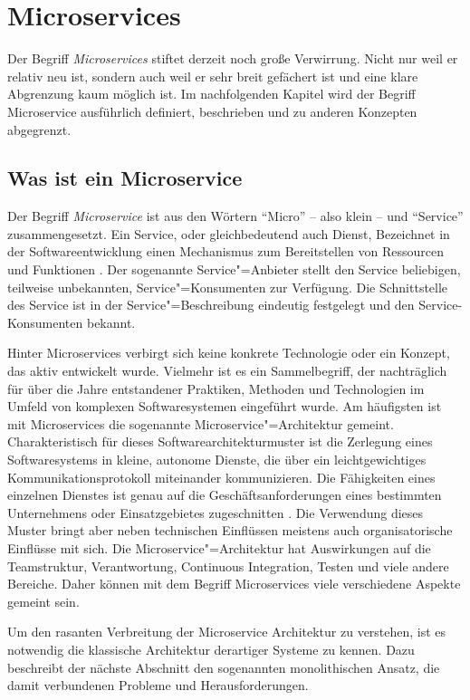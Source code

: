 \chapter{Microservices}

Der Begriff \textit{Microservices} stiftet derzeit noch große Verwirrung. Nicht nur weil er relativ neu ist, sondern auch weil er sehr breit gefächert ist und eine klare Abgrenzung kaum möglich ist. Im nachfolgenden Kapitel wird der Begriff Microservice ausführlich definiert, beschrieben und zu anderen Konzepten abgegrenzt.

\section{Was ist ein Microservice}

Der Begriff \textit{Microservice} ist aus den Wörtern "`Micro"' -- also klein -- und "`Service"' zusammengesetzt. Ein Service, oder gleichbedeutend auch Dienst,  Bezeichnet in der Softwareentwicklung einen Mechanismus zum Bereitstellen von Ressourcen und Funktionen \cite[12]{Brown06referencemodel}. Der sogenannte Service"=Anbieter stellt den Service beliebigen, teilweise unbekannten, Service"=Konsumenten zur Verfügung. Die Schnittstelle des Service ist in der Service"=Beschreibung eindeutig festgelegt und den Service-Konsumenten bekannt.

Hinter Microservices verbirgt sich keine konkrete Technologie oder ein Konzept, das aktiv entwickelt wurde. Vielmehr ist es ein Sammelbegriff, der nachträglich für über die Jahre entstandener Praktiken, Methoden und Technologien im Umfeld von komplexen Softwaresystemen eingeführt wurde. Am häufigsten ist mit Microservices die sogenannte Microservice"=Architektur gemeint. Charakteristisch für dieses Softwarearchitekturmuster ist die Zerlegung eines Softwaresystems in kleine, autonome Dienste, die über ein leichtgewichtiges Kommunikationsprotokoll miteinander kommunizieren. Die Fähigkeiten eines einzelnen Dienstes ist genau auf die Geschäftsanforderungen eines bestimmten Unternehmens oder Einsatzgebietes zugeschnitten \cite{FowlerMS}. Die Verwendung dieses Muster bringt aber neben technischen Einflüssen meistens auch organisatorische Einflüsse mit sich. Die Microservice"=Architektur hat Auswirkungen auf die Teamstruktur, Verantwortung, Continuous Integration, Testen und viele andere Bereiche. Daher können mit dem Begriff Microservices viele verschiedene Aspekte gemeint sein.

Um den rasanten Verbreitung der Microservice Architektur zu verstehen, ist es notwendig die klassische Architektur derartiger Systeme zu kennen. Dazu beschreibt der nächste Abschnitt den sogenannten monolithischen Ansatz, die damit verbundenen Probleme und Herausforderungen.

